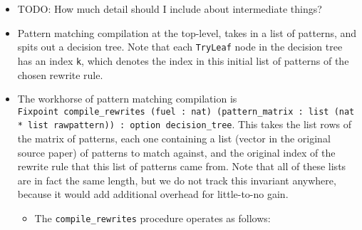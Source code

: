 \begin{itemize}
  \begin{itemize}
  \tightlist
  \item
    TODO: How much detail should I include about intermediate things?
  \item
    Pattern matching compilation at the top-level, takes in a list of
    patterns, and spits out a decision tree. Note that each
    \texttt{TryLeaf} node in the decision tree has an index \texttt{k},
    which denotes the index in this initial list of patterns of the
    chosen rewrite rule.
  \item
    The workhorse of pattern matching compilation is
    \texttt{Fixpoint\ compile\_rewrites\textquotesingle{}\ (fuel\ :\ nat)\ (pattern\_matrix\ :\ list\ (nat\ *\ list\ rawpattern))\ :\ option\ decision\_tree}.
    This takes the list rows of the matrix of patterns, each one
    containing a list (vector in the original source paper) of patterns
    to match against, and the original index of the rewrite rule that
    this list of patterns came from. Note that all of these lists are in
    fact the same length, but we do not track this invariant anywhere,
    because it would add additional overhead for little-to-no gain.

    \begin{itemize}
    \tightlist
    \item
      The \texttt{compile\_rewrites\textquotesingle{}} procedure
      operates as follows:


\end{itemize}
\end{itemize}
\end{itemize}
